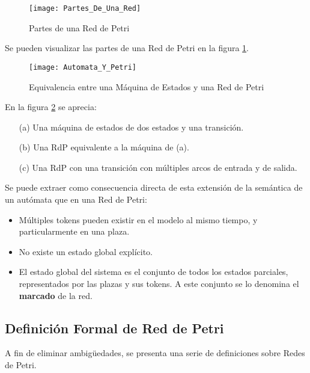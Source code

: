 \begin{figure}[h]
	\centering
	\texttt{[image: Partes\_De\_Una\_Red]}
	\caption{Partes de una Red de Petri}
	\label{fig:partes_de_una_red}
\end{figure}

Se pueden visualizar las partes de una Red de Petri en la figura
\ref{fig:partes_de_una_red}.\\


\begin{figure}[h]
    \centering
    \texttt{[image: Automata\_Y\_Petri]}
    \caption{Equivalencia entre una Máquina de Estados y una Red de Petri}
    \label{fig:automata_y_petri}
\end{figure}

En la figura \ref{fig:automata_y_petri} se aprecia:\\
\begin{itemize}
  \item[(a)] Una máquina de estados de dos estados y una transición.
  \item[(b)] Una RdP equivalente a la máquina de (a).
  \item[(c)] Una RdP con una transición con múltiples arcos de entrada y de
  salida.
\end{itemize}

Se puede extraer como consecuencia directa de esta extensión de la semántica de
un autómata que en una Red de Petri:
\begin{itemize}
  \item Múltiples tokens pueden existir en el modelo al mismo tiempo, y
  particularmente en una plaza.
  \item No existe un estado global explícito.
  \item El estado global del sistema es el conjunto de todos los estados
  parciales, representados por las plazas y sus tokens. A este conjunto se lo
  denomina el \textbf{marcado} de la red.
\end{itemize}

\subsection{Definición Formal de Red de Petri}
\label{def_formal_petri}
A fin de eliminar ambigüedades, se presenta una serie de definiciones sobre
Redes de Petri.

